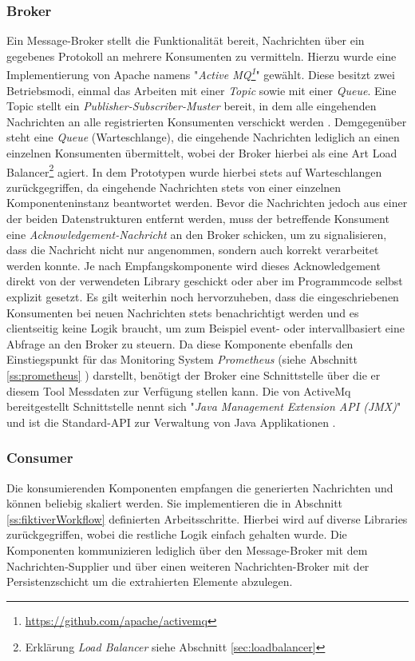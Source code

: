 \subsubsection{Broker}
\label{ss:broker}
Ein Message-Broker stellt die Funktionalität bereit, Nachrichten über ein gegebenes Protokoll an mehrere Konsumenten zu vermitteln. Hierzu wurde eine Implementierung von Apache namens "\emph{Active MQ\footnote{\url{https://github.com/apache/activemq}}}" gewählt. Diese besitzt zwei Betriebsmodi, einmal das Arbeiten mit einer \emph{Topic} sowie mit einer \emph{Queue}. Eine Topic stellt ein \emph{Publisher-Subscriber-Muster} bereit, in dem alle eingehenden Nachrichten an alle registrierten Konsumenten verschickt werden \cite[Seite~33 ff.]{activemq-snyder}. Demgegenüber steht eine \emph{Queue} (Warteschlange), die eingehende Nachrichten lediglich an einen einzelnen Konsumenten übermittelt, wobei der Broker hierbei als eine Art Load Balancer\footnote{Erklärung \emph{Load Balancer} siehe Abschnitt \ref{sec:loadbalancer} } agiert. In dem Prototypen wurde hierbei stets auf Warteschlangen zurückgegriffen, da eingehende Nachrichten stets von einer einzelnen Komponenteninstanz beantwortet werden. Bevor die Nachrichten jedoch aus einer der beiden Datenstrukturen entfernt werden, muss der betreffende Konsument eine \emph{Acknowledgement-Nachricht} an den Broker schicken, um zu signalisieren, dass die Nachricht nicht nur angenommen, sondern auch korrekt verarbeitet werden konnte. Je nach Empfangskomponente wird dieses Acknowledgement direkt von der verwendeten Library geschickt oder aber im Programmcode selbst explizit gesetzt. Es gilt weiterhin noch hervorzuheben, dass die eingeschriebenen Konsumenten bei neuen Nachrichten stets benachrichtigt werden und es clientseitig keine Logik braucht, um zum Beispiel event- oder intervallbasiert eine Abfrage an den Broker zu steuern. Da diese Komponente ebenfalls den Einstiegspunkt für das Monitoring System \emph{Prometheus} (siehe Abschnitt \ref{ss:prometheus} ) darstellt, benötigt der Broker eine Schnittstelle über die er diesem Tool Messdaten zur Verfügung stellen kann. Die von ActiveMq bereitgestellt Schnittstelle nennt sich "\emph{Java Management Extension API (JMX)}" und ist die Standard-API zur Verwaltung von Java Applikationen \cite[Seite~331 ff.]{activemq-snyder}.


\subsubsection{Consumer}
Die konsumierenden Komponenten empfangen die generierten Nachrichten und können beliebig skaliert werden. Sie implementieren die in Abschnitt \ref{ss:fiktiverWorkflow} definierten Arbeitsschritte. Hierbei wird auf diverse Libraries zurückgegriffen, wobei die restliche Logik einfach gehalten wurde. Die Komponenten kommunizieren lediglich über den Message-Broker mit dem Nachrichten-Supplier und über einen weiteren Nachrichten-Broker mit der Persistenzschicht um die extrahierten Elemente abzulegen.


